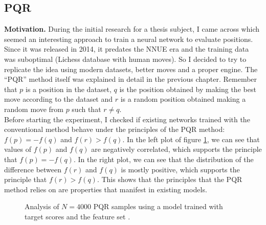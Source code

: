 \newpage
\subsection{PQR}

\textbf{Motivation.} During the initial research for a thesis subject, I came across \cite{dlchess:2014} which seemed an interesting approach to train a neural network to evaluate positions. Since it was released in 2014, it predates the NNUE era and the training data was suboptimal (Lichess database \cite{lichessdb} with human moves). So I decided to try to replicate the idea using modern datasets, better moves and a proper engine. The \enquote{PQR} method itself was explained in detail in the previous chapter.  Remember that $p$ is a position in the dataset, $q$ is the position obtained by making the best move according to the dataset and $r$ is a random position obtained making a random move from $p$ such that $r \neq q$. \\

Before starting the experiment, I checked if existing networks trained with the conventional method behave under the principles of the PQR method: ${f(p) = -f(q)}$ and ${f(r) > f(q)}$. In the left plot of figure \ref{pqr-eval}, we can see that values of $f(p)$ and $f(q)$ are negatively correlated, which supports the principle that $f(p)=-f(q)$. In the right plot, we can see that the distribution of the difference between $f(r)$ and $f(q)$ is mostly positive, which supports the principle that $f(r) > f(q)$. This shows that the principles that the PQR method relies on are properties that manifest in existing models.

\begin{figure}[H]
\centering
{}
\caption{Analysis of $N=4000$ PQR samples using a model trained with target scores and the feature set .}
\label{pqr-eval}
\end{figure}

